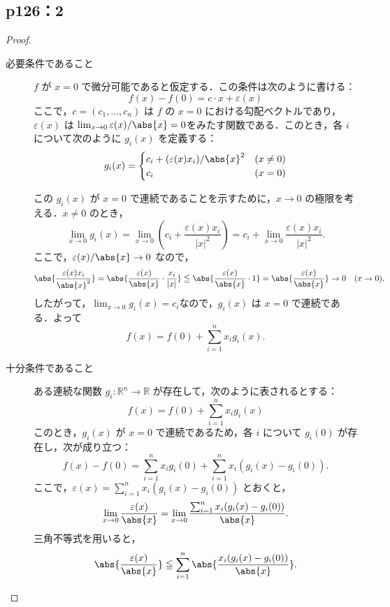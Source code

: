 \documentclass[uplatex,dvipdfmx,a4paper,10pt,fleqn]{jsarticle}
\begin{document}
\subsection*{p126：2}


\begin{tleftbar}
    \begin{proof}
        \begin{description}
            \item[必要条件であること] 
            $ f $ が $ x=0 $ で微分可能であると仮定する．この条件は次のように書ける：
            \[
            f(x) - f(0) = c \cdot x + \varepsilon(x)
            \]
            ここで，$ c = (c_1, \ldots, c_n) $ は $ f $ の $ x=0 $ における勾配ベクトルであり，$ \varepsilon(x) $ は
            $\lim_{x \to 0} \varepsilon(x)/\abs{x} = 0$をみたす関数である．このとき，各 $ i $ について次のように $ g_i(x) $ を定義する：
            \[
            g_i(x) = 
            \begin{cases}
            c_i + (\varepsilon(x) x_i)/\abs{x}^2 & (x \ne 0) \\
            c_i & (x = 0)
            \end{cases}
            \]

            この $ g_i(x) $ が $ x=0 $ で連続であることを示すために，$ x \to 0 $ の極限を考える．$ x \ne 0 $ のとき，
            \[
            \lim_{x \to 0} g_i(x) = \lim_{x \to 0} \left( c_i + \frac{\varepsilon(x) x_i}{|x|^2} \right) = c_i + \lim_{x \to 0} \frac{\varepsilon(x) x_i}{|x|^2}.
            \]
            ここで，$\varepsilon(x)/\abs{x} \to 0 $ なので，
            \[
            \abs{\frac{\varepsilon(x) x_i}{\abs{x}^2}} = \abs{\frac{\varepsilon(x)}{\abs{x}} \cdot \frac{x_i}{|x|}} \leqq  \abs{\frac{\varepsilon(x)}{\abs{x}} \cdot 1} = \abs{\frac{\varepsilon(x)}{\abs{x}}} \to 0 \quad (x \to 0).
            \]
            したがって，$\lim_{x \to 0} g_i(x) = c_i$なので，$ g_i(x) $ は $ x=0 $ で連続である．よって
            \[
            f(x) = f(0) + \sum_{i=1}^n x_i g_i(x).
            \]
            \item [十分条件であること]
            ある連続な関数 $ g_i \colon \mathbb{R}^n \to \mathbb{R} $ が存在して，次のように表されるとする：
            \[
            f(x) = f(0) + \sum_{i=1}^n x_i g_i(x)
            \]
            このとき，$ g_i(x) $ が $ x=0 $ で連続であるため，各 $ i $ について $ g_i(0) $ が存在し，次が成り立つ：
            \[
            f(x) - f(0) = \sum_{i=1}^n x_i g_i(0) + \sum_{i=1}^n x_i (g_i(x) - g_i(0)).
            \]
            ここで，$ \varepsilon(x) = \sum_{i=1}^n x_i (g_i(x) - g_i(0)) $ とおくと，
            \[
            \lim_{x \to 0} \frac{\varepsilon(x)}{\abs{x}} = \lim_{x \to 0} \frac{\sum_{i=1}^n x_i (g_i(x) - g_i(0))}{\abs{x}}.
            \]
            三角不等式を用いると，
            \[
            \abs{ \frac{\varepsilon(x)}{\abs{x}} } \leqq \sum_{i=1}^n \abs{ \frac{x_i(g_i(x) - g_i(0))}{\abs{x}} }.
            \]


\end{description}
\end{proof}
\end{tleftbar}
\end{document}
